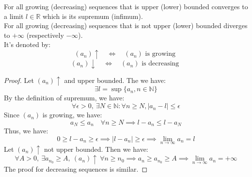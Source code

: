 \begin{theorem}
    For all growing (decreasing) sequences that is upper (lower) bounded converges to a limit $l \in \mathbb{R}$ which is its supremum (infimum). \\
    For all growing (decreasing) sequences that is not upper (lower) bounded diverges to $+\infty$ (respectively $-\infty$). \\
    It's denoted by:
    \[ (a_n) \uparrow \quad \Leftrightarrow \quad (a_n) \text{ is growing } \]
    \[ (a_n) \downarrow \quad \Leftrightarrow \quad (a_n) \text{ is decreasing } \]
\end{theorem}
\begin{proof}
    Let $(a_n) \uparrow$ and upper bounded. The we have:
    \[ \exists l = \sup \{a_n, n \in \mathbb{N}\} \]
    By the definition of supremum, we have:
    \[ \forall \epsilon > 0, \ \exists N \in \mathbb{N} : \forall n \geq N, |a_n - l| \leq \epsilon \]
    Since $(a_n)$ is growing, we have:
    \[ a_N \leq a_{n} \quad \forall n \geq N \implies l - a_n \leq l - a_N \]
    Thus, we have:
    \[
        0 \geq l - a_n \geq \epsilon \implies |l - a_n| \geq \epsilon \implies \lim_{n \to \infty} a_n = l
    \]
    Let $(a_n) \uparrow$ not upper bounded. Then we have:
    \[
        \forall A > 0, \ \exists a_{n_0} \geq A, \ (a_n) \uparrow \ \forall n \geq n_0 \implies a_n \geq a_{n_0} \geq A \implies \lim_{n \to \infty} a_n = +\infty
    \] 
    The proof for decreasing sequences is similar.
\end{proof}

